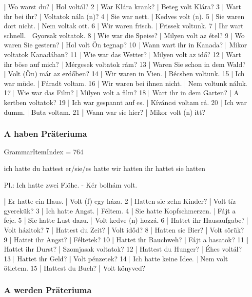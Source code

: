 \documentclass{article}
\newenvironment{desc}{\verbatim}{\endverbatim}
\newenvironment{exmp}{\verbatim}{\endverbatim}
\begin{document}
\begin{exmp}
1 | Wo warst du? | Hol voltál?
2 | War Klára krank? | Beteg volt Klára?
3 | Wart ihr bei ihr? | Voltatok nála (n)?
4 | Sie war nett. | Kedves volt (n).
5 | Sie waren dort nicht. | Nem voltak ott.
6 | Wir waren frisch. | Frissek voltunk.
7 | Ihr wart schnell. | Gyorsak voltatok.
8 | Wie war die Speise? | Milyen volt az étel?
9 | Wo waren Sie gestern? | Hol volt Ön tegnap?
10 | Wann wart ihr in Kanada? | Mikor voltatok Kanadában?
11 | Wie war das Wetter? | Milyen volt az idő?
12 | Wart ihr böse auf mich? | Mérgesek voltatok rám?
13 | Waren Sie schon in dem Wald? | Volt (Ön) már az erdőben?
14 | Wir waren in Vien. | Bécsben voltunk.
15 | Ich war müde. | Fáradt voltam.
16 | Wir waren bei ihnen nicht. | Nem voltunk náluk.
17 | Wie war das Film? | Milyen volt a film?
18 | Wart ihr in dem Garten? | A kertben voltatok?
19 | Ich war gespannt auf es. | Kíváncsi voltam rá.
20 | Ich war dumm. | Buta voltam.
21 | Wann war sie hier? | Mikor volt (n) itt?
\end{exmp}

\subsubsection{A haben Präteriuma}

GrammarItemIndex = 764

\begin{desc}
ich hatte
du hattest
er/sie/es hatte
wir hatten
ihr hattet
sie hatten

Pl.: Ich hatte zwei Flöhe. - Kér bolhám volt.
\end{desc}

\begin{exmp}
1 | Er hatte ein Haus. | Volt (f) egy háza.
2 | Hatten sie zehn Kinder? | Volt tíz gyerekük?
3 | Ich hatte Angst. | Féltem.
4 | Sie hatte Kopfschmerzen. | Fájt a feje.
5 | Sie hatte Lust dazu. | Volt kedve (n) hozzá.
6 | Hattet ihr Hausaufgabe? | Volt házitok?
7 | Hattest du Zeit? | Volt időd?
8 | Hatten sie Bier? | Volt sörük?
9 | Hattet ihr Angst? | Féltetek?
10 | Hattet ihr Bauchweh? | Fájt a hasatok?
11 | Hattet ihr Durst? | Szomjasak voltatok?
12 | Hattest du Hunger? | Éhes voltál?
13 | Hattet ihr Geld? | Volt pénzetek?
14 | Ich hatte keine Idee. | Nem volt ötletem.
15 | Hattest du Buch? | Volt könyved?
\end{exmp}

\subsubsection{A werden Präteriuma}
\end{document}
